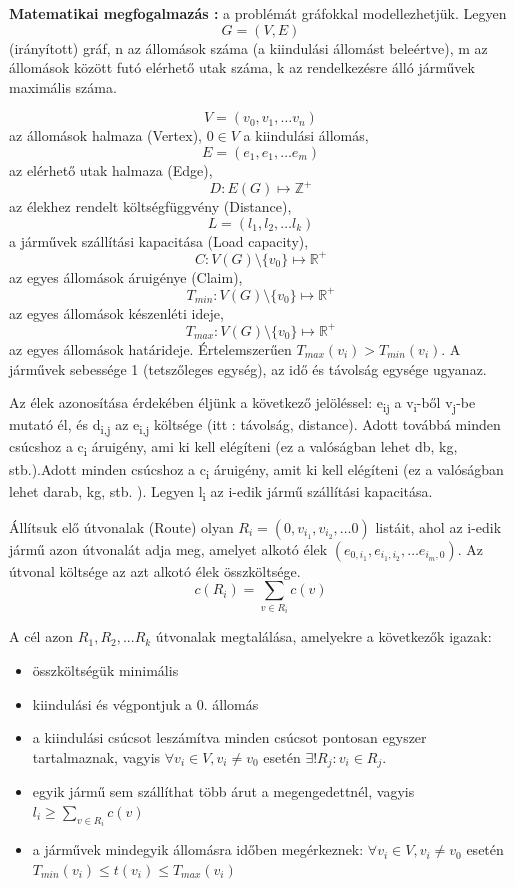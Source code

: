 \textbf{Matematikai megfogalmazás :} a problémát gráfokkal modellezhetjük.
\newline 
Legyen \[ G = (V,E) \] (irányított) gráf, n az állomások száma (a kiindulási állomást beleértve), m az állomások között futó elérhető utak száma, k az rendelkezésre álló járművek maximális száma.

\[ V = (v_0,v_1, \dots v_n )\] az állomások halmaza (Vertex), \(0 \in V\) a kiindulási állomás,
\[ E = (e_1,e_1, \dots e_m)\] az elérhető utak halmaza (Edge),
\[ D : E(G) \mapsto \mathbb{Z}^+\] az élekhez rendelt költségfüggvény (Distance),
\[ L = (l_1,l_2, \dots l_k)\] a járművek szállítási kapacitása (Load capacity),
\[ C : V(G)\setminus \{v_0\} \mapsto \mathbb{R}^+ \] az egyes állomások áruigénye (Claim),
\[ T_{min} :  V(G)\setminus \{v_0\} \mapsto \mathbb{R}^+ \] az egyes állomások készenléti ideje,
\[ T_{max} :  V(G)\setminus \{v_0\} \mapsto \mathbb{R}^+ \] az egyes állomások határideje. Értelemszerűen \(T_{max}(v_i) > T_{min}(v_i) \). A járművek sebessége 1 (tetszőleges egység), az idő és távolság egysége ugyanaz.

Az élek azonosítása érdekében éljünk a következő jelöléssel: e\textsubscript{ij} a v\textsubscript{i}-ből v\textsubscript{j}-be mutató él, és d\textsubscript{i,j} az e\textsubscript{i,j} költsége (itt : távolság, distance). Adott továbbá minden csúcshoz a c\textsubscript{i} áruigény, ami ki kell elégíteni (ez a valóságban lehet db, kg, stb.).Adott minden csúcshoz a c\textsubscript{i} áruigény, amit ki kell elégíteni (ez a valóságban lehet darab, kg, stb. ).  Legyen l\textsubscript{i} az i-edik jármű szállítási kapacitása.

Állítsuk elő útvonalak (Route) olyan \( R_{i} = (0, v_{i_1}, v_{i_2}, \dots 0) \) listáit,
ahol az i-edik jármű azon útvonalát adja meg, amelyet alkotó élek 
\( (e_{0,i_{1}}, e_{i_{1},i_{2}}, \dots e_{i_{m},0}) \). Az útvonal költsége az azt alkotó élek összköltsége. 
\begin{equation}
	c(R_i) = \sum_{v \in R_i} c(v)
\end{equation}


A cél azon \(R_1,R_2,...R_k \) útvonalak megtalálása, amelyekre a következők igazak:
\begin{itemize}
	\item összköltségük minimális
	\item kiindulási és végpontjuk a 0. állomás
	\item a kiindulási csúcsot leszámítva minden csúcsot pontosan egyszer tartalmaznak, vagyis \(\forall v_i \in V, v_i\ne v_0\) esetén \( \exists!R_j : v_i \in R_j \). 
	\item egyik jármű sem szállíthat több árut a megengedettnél, vagyis \(l_i \geqslant \sum_{v \in R_i} c(v) \)
	\item a járművek mindegyik állomásra időben megérkeznek: \(\forall v_i \in V, v_i\ne v_0\) esetén \( T_{min}(v_i) \leqslant t(v_i) \leqslant T_{max}(v_i) \)
\end{itemize}


